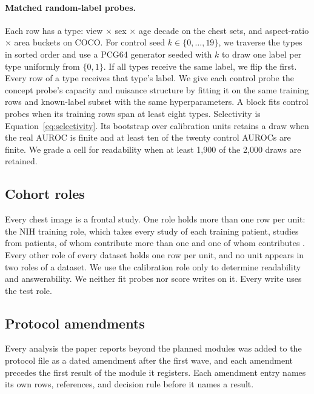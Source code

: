 \documentclass{article}
\begin{document}
\paragraph{Matched random-label probes.} Each row has a type: view $\times$ sex $\times$ age decade on the chest sets, and aspect-ratio $\times$ area buckets on COCO. For control seed $k\in\{0,\dots,19\}$, we traverse the types in sorted order and use a PCG64 generator seeded with $k$ to draw one label per type uniformly from $\{0,1\}$. If all types receive the same label, we flip the first. Every row of a type receives that type's label. We give each control probe the concept probe's capacity and nuisance structure by fitting it on the same training rows and known-label subset with the same hyperparameters. A block fits control probes when its training rows span at least eight types. Selectivity is Equation~\ref{eq:selectivity}. Its bootstrap over calibration units retains a draw when the real AUROC is finite and at least ten of the twenty control AUROCs are finite. We grade a cell for readability when at least 1{,}900 of the 2{,}000 draws are retained.

\subsection{Cohort roles}
\label{app:repro-cohorts}

Every chest image is a frontal study. One role holds more than one row per unit: the NIH training role, which takes every study of each training patient, \cfCohortNihTrainRows{} studies from \cfCohortNihTrainUnits{} patients, \cfCohortNihTrainMulti{} of whom contribute more than one and one of whom contributes \cfCohortNihTrainMax{}. Every other role of every dataset holds one row per unit, and no unit appears in two roles of a dataset. We use the calibration role only to determine readability and answerability. We neither fit probes nor score writes on it. Every write uses the test role.

\FloatBarrier

\subsection{Protocol amendments}
\label{app:repro-protocol}

Every analysis the paper reports beyond the \cfCoveragePlannedWord{} planned modules was added to the protocol file as a dated amendment after the first wave, and each amendment precedes the first result of the module it registers. Each amendment entry names its own rows, references, and decision rule before it names a result.
\end{document}
